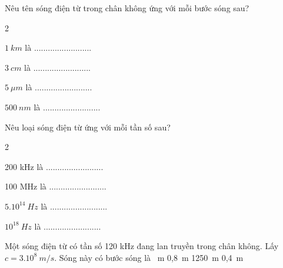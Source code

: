 \begin{vidu}
Nêu tên sóng điện từ trong chân không ứng với mỗi bước sóng sau?
\begin{enumEX}[a)]{2}
\item {$1\ km$} là .........................
\item {$3\ cm$} là .........................
\item {$5\ \mu m$} là .........................
\item {$500\ nm$} là .........................
\end{enumEX}
\end{vidu}
\begin{vidu}
Nêu loại sóng điện từ ứng với mỗi tần số sau?
\begin{enumEX}[a)]{2}
\item {200 kHz} là .........................
\item {100 MHz} là .........................
\item {$5.10^{14}\ Hz$} là .........................  
\item {$10^{18}\ Hz$} là .........................  
\end{enumEX}
\end{vidu}
\begin{vidu} %
 Một sóng điện từ có tần số 120 kHz đang lan truyền trong chân không. Lấy $c = 3.10^8\ m/s$. Sóng này có bước sóng là
\choice
{\ m}
{0,8\ m}
{1250\ m}
{0,4\ m}
\end{vidu} 
